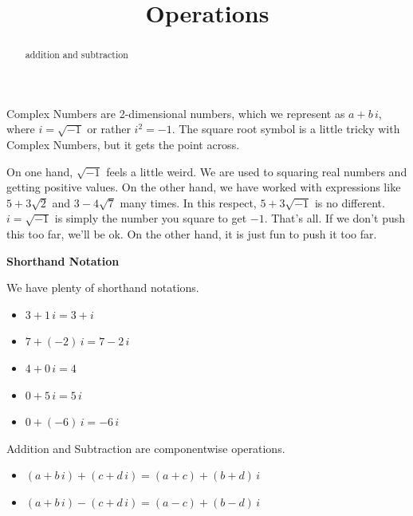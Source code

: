 \documentclass{ximera}
\title{Operations}
\begin{document}
\begin{abstract}
addition and subtraction
\end{abstract}
\maketitle



Complex Numbers are 2-dimensional numbers, which we represent as $a + b \, i$, where $i = \sqrt{-1}$ or rather $i^2 = -1$.  The square root symbol is a little tricky with Complex Numbers, but it gets the point across. 





On one hand, $\sqrt{-1}$ feels a little weird.  We are used to squaring real numbers and getting positive values. On the other hand, we have worked with expressions like $5 + 3 \sqrt{2}$ and $3 - 4 \sqrt{7}$ many times.  In this respect, $5 + 3 \sqrt{-1}$ is no different.  $i = \sqrt{-1}$ is simply the number you square to get $-1$.  That's all. If we don't push this too far, we'll be ok.  On the other hand, it is just fun to push it too far.



\begin{notation} \textbf{\textcolor{red!50!green}{Shorthand Notation}} 



We have plenty of shorthand notations.

\begin{itemize}
\item $3 + 1 \, i = 3 + i$
\item $7 + (-2) \, i = 7 - 2 \, i$
\item $4 + 0 \, i = 4$
\item $0 + 5 \, i = 5 \, i$
\item $0 + (-6) \, i = -6 \, i$
\end{itemize}


\end{notation}





Addition and Subtraction are componentwise operations.


\begin{itemize}
	\item $(a + b \, i) + (c + d \, i) = (a+c) + (b+d) \, i$
	\item $(a + b \, i) - (c + d \, i) = (a-c) + (b-d) \, i$
\end{itemize}
\end{document}
